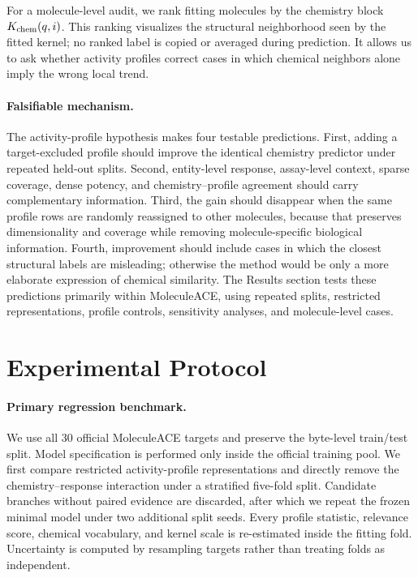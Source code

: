 \documentclass[manuscript,nonacm]{acmart}
\newcommand{\mace}{MoleculeACE\xspace}
\begin{document}
For a molecule-level audit, we rank fitting molecules by the chemistry block
$K_{\rm chem}(q,i)$. This ranking visualizes the structural neighborhood seen
by the fitted kernel; no ranked label is copied or averaged during prediction.
It allows us to ask whether activity profiles correct cases in which chemical
neighbors alone imply the wrong local trend.

\paragraph{Falsifiable mechanism.}
The activity-profile hypothesis makes four testable predictions. First,
adding a target-excluded profile should improve the identical chemistry
predictor under repeated held-out splits. Second, entity-level response,
assay-level context, sparse coverage, dense potency, and chemistry--profile
agreement should carry complementary information. Third, the gain should
disappear when the same profile rows are randomly reassigned to other
molecules, because that preserves dimensionality and coverage while removing
molecule-specific biological information. Fourth, improvement should include
cases in which the closest structural labels are misleading; otherwise the
method would be only a more elaborate expression of chemical similarity. The
Results section tests these predictions primarily within \mace, using repeated
splits, restricted representations, profile controls, sensitivity analyses, and
molecule-level cases.




\section{Experimental Protocol}
\paragraph{Primary regression benchmark.}
We use all 30 official \mace targets and preserve the byte-level train/test
split. Model specification is performed only inside the official training pool.
We first compare restricted activity-profile representations and directly remove the
chemistry--response interaction under a stratified five-fold split. Candidate
branches without paired evidence are discarded, after which we repeat the
frozen minimal model under two additional split seeds. Every profile statistic,
relevance score, chemical vocabulary,
and kernel scale is re-estimated inside the fitting fold. Uncertainty is
computed by resampling targets rather than treating folds as independent.
\end{document}

